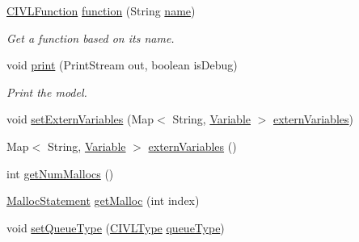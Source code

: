 \begin{DoxyCompactItemize}
\item 
\hyperlink{interfaceedu_1_1udel_1_1cis_1_1vsl_1_1civl_1_1model_1_1IF_1_1CIVLFunction}{C\+I\+V\+L\+Function} \hyperlink{interfaceedu_1_1udel_1_1cis_1_1vsl_1_1civl_1_1model_1_1IF_1_1Model_a17b01427679c9ceacc699280c3b949e8}{function} (String \hyperlink{interfaceedu_1_1udel_1_1cis_1_1vsl_1_1civl_1_1model_1_1IF_1_1Model_a1b2f91dc6e7a7a9c0311cb2902953dfb}{name})
\begin{DoxyCompactList}\small\item\em Get a function based on its name. \end{DoxyCompactList}\item 
void \hyperlink{interfaceedu_1_1udel_1_1cis_1_1vsl_1_1civl_1_1model_1_1IF_1_1Model_aac3c2197fa5a06db065d35dc609d8348}{print} (Print\+Stream out, boolean is\+Debug)
\begin{DoxyCompactList}\small\item\em Print the model. \end{DoxyCompactList}\item 
void \hyperlink{interfaceedu_1_1udel_1_1cis_1_1vsl_1_1civl_1_1model_1_1IF_1_1Model_a68e651b0162f946bc2d4dfb3ccb480c9}{set\+Extern\+Variables} (Map$<$ String, \hyperlink{interfaceedu_1_1udel_1_1cis_1_1vsl_1_1civl_1_1model_1_1IF_1_1variable_1_1Variable}{Variable} $>$ \hyperlink{interfaceedu_1_1udel_1_1cis_1_1vsl_1_1civl_1_1model_1_1IF_1_1Model_ad5a9d7309f9c8dfbe4448ba9a6fee0f7}{extern\+Variables})
\item 
Map$<$ String, \hyperlink{interfaceedu_1_1udel_1_1cis_1_1vsl_1_1civl_1_1model_1_1IF_1_1variable_1_1Variable}{Variable} $>$ \hyperlink{interfaceedu_1_1udel_1_1cis_1_1vsl_1_1civl_1_1model_1_1IF_1_1Model_ad5a9d7309f9c8dfbe4448ba9a6fee0f7}{extern\+Variables} ()
\item 
int \hyperlink{interfaceedu_1_1udel_1_1cis_1_1vsl_1_1civl_1_1model_1_1IF_1_1Model_a2ec940ccf6cb1a914cc5a9257f243d9a}{get\+Num\+Mallocs} ()
\item 
\hyperlink{interfaceedu_1_1udel_1_1cis_1_1vsl_1_1civl_1_1model_1_1IF_1_1statement_1_1MallocStatement}{Malloc\+Statement} \hyperlink{interfaceedu_1_1udel_1_1cis_1_1vsl_1_1civl_1_1model_1_1IF_1_1Model_ae19492b5a4286e31b92bff393cb5083e}{get\+Malloc} (int index)
\item 
void \hyperlink{interfaceedu_1_1udel_1_1cis_1_1vsl_1_1civl_1_1model_1_1IF_1_1Model_aa16b413bd3720e2bd2d43a2f64be1240}{set\+Queue\+Type} (\hyperlink{interfaceedu_1_1udel_1_1cis_1_1vsl_1_1civl_1_1model_1_1IF_1_1type_1_1CIVLType}{C\+I\+V\+L\+Type} \hyperlink{interfaceedu_1_1udel_1_1cis_1_1vsl_1_1civl_1_1model_1_1IF_1_1Model_a8f766883a174af7c62d0a426e0e729fd}{queue\+Type})

\end{DoxyCompactItemize}
